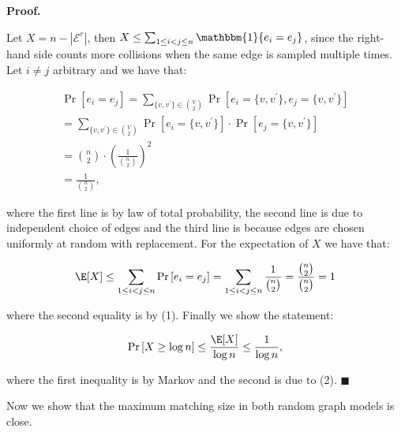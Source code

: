 \par\medskip\noindent\textbf{Proof.}\par



Let $X=n-|\mathcal{E}^{r}|$, then $X\leq\sum_{1\leq i<j\leq n}\mathbbm{1}\{e_{i}=e_{j}\}$, since the right-hand side counts more collisions when the same edge is sampled multiple times.
Let $i\neq j$ arbitrary and we have that:\par


\[\begin{gathered}
\displaystyle\Pr\left[e_{i}=e_{j}\right] \displaystyle=\sum_{\{v,v^{\prime}\}\in\binom{V}{2}}\Pr\left[e_{i}=\{v,v^{\prime}\},e_{j}=\{v,v^{\prime}\}\right] \\
\displaystyle=\sum_{\{v,v^{\prime}\}\in\binom{V}{2}}\Pr\left[e_{i}=\{v,v^{\prime}\}\right]\cdot\Pr\left[e_{j}=\{v,v^{\prime}\}\right] \\
\displaystyle=\binom{n}{2}\cdot\left(\frac{1}{\binom{n}{2}}\right)^{2} \\
\displaystyle=\frac{1}{\binom{n}{2}},
\end{gathered}\]


where the first line is by law of total probability, the second line is due to independent choice of edges and the third line is because edges are chosen uniformly at random with replacement.
For the expectation of $X$ we have that:\par


\[\begin{gathered}
\displaystyle\E[X]\leq\sum_{1\leq i<j\leq n}\Pr\left[e_{i}=e_{j}\right]=\sum_{1\leq i<j\leq n}\frac{1}{\binom{n}{2}}=\frac{\binom{n}{2}}{\binom{n}{2}}=1
\end{gathered}\]


where the second equality is by (1).
Finally we show the statement:\par


\[\begin{gathered}
\displaystyle\Pr\left[X\geq\log{n}\right]\leq\frac{\E[X]}{\log{n}}\leq\frac{1}{\log{n}},
\end{gathered}\]


where the first inequality is by Markov and the second is due to (2).
\ensuremath{\blacksquare}\par





Now we show that the maximum matching size in both random graph models is close.\par



